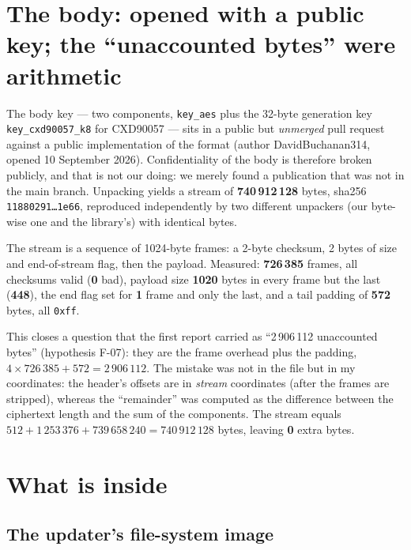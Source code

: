 \documentclass[12pt]{article}
\newcommand{\code}[1]{\texttt{\small #1}}
\newcommand{\hx}[1]{\texttt{\footnotesize #1}}
\begin{document}
\section{The body: opened with a public key; the ``unaccounted bytes'' were arithmetic}
\label{sec:body}

The body key --- two components, \code{key\_aes} plus the 32-byte generation key
\code{key\_cxd90057\_k8} for CXD90057 ---
sits in a public but \emph{unmerged} pull request against a public implementation of the
format (author DavidBuchanan314, opened 10 September 2026). Confidentiality of the body is
therefore broken publicly, and that is not our doing: we merely found a publication that was
not in the main branch. Unpacking yields a stream of \textbf{740\,912\,128} bytes, sha256
\hx{11880291\ldots 1e66}, reproduced independently by two different unpackers (our byte-wise
one and the library's) with identical bytes.

The stream is a sequence of 1024-byte frames: a 2-byte checksum, 2 bytes of size and
end-of-stream flag, then the payload. Measured: \textbf{726\,385} frames, all checksums
valid (\textbf{0} bad), payload size \textbf{1020} bytes in every frame but the last
(\textbf{448}), the end flag set for \textbf{1} frame and only the last, and a tail padding
of \textbf{572} bytes, all \code{0xff}.

This closes a question that the first report carried as ``2\,906\,112 unaccounted bytes''
(hypothesis F-07): they are the frame overhead plus the padding,
$4 \times 726\,385 + 572 = 2\,906\,112$. The mistake was not in the file but in my
coordinates: the header's offsets are in \emph{stream} coordinates (after the frames are
stripped), whereas the ``remainder'' was computed as the difference between the ciphertext
length and the sum of the components. The stream equals
$512 + 1\,253\,376 + 739\,658\,240 = 740\,912\,128$ bytes, leaving
\textbf{0} extra bytes.

\section{What is inside}
\label{sec:inside}

\subsection{The updater's file-system image}
\end{document}
